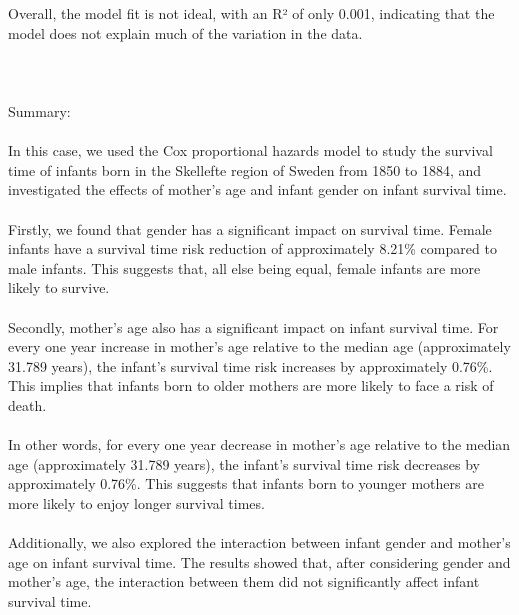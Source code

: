 \documentclass[12pt,letterpaper]{article}
\begin{document}
Overall, the model fit is not ideal, with an R² of only 0.001, indicating that the model does not explain much of the variation in the data.\\\\
\\\\
Summary:\\\\
In this case, we used the Cox proportional hazards model to study the survival time of infants born in the Skellefte region of Sweden from 1850 to 1884, and investigated the effects of mother's age and infant gender on infant survival time.\\\\
Firstly, we found that gender has a significant impact on survival time. Female infants have a survival time risk reduction of approximately 8.21\% compared to male infants. This suggests that, all else being equal, female infants are more likely to survive.\\\\
Secondly, mother's age also has a significant impact on infant survival time. For every one year increase in mother's age relative to the median age (approximately 31.789 years), the infant's survival time risk increases by approximately 0.76\%. This implies that infants born to older mothers are more likely to face a risk of death.\\\\
In other words, for every one year decrease in mother's age relative to the median age (approximately 31.789 years), the infant's survival time risk decreases by approximately 0.76\%. This suggests that infants born to younger mothers are more likely to enjoy longer survival times.\\\\
Additionally, we also explored the interaction between infant gender and mother's age on infant survival time. The results showed that, after considering gender and mother's age, the interaction between them did not significantly affect infant survival time.\\\\
\end{document}
